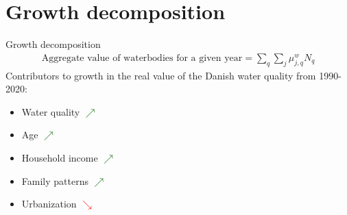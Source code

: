 \section{Growth decomposition}

\begin{frame}{Growth decomposition}
  \begin{align*}
    \text{Aggregate value of waterbodies for a given year}=\sum_q\sum_j\mu_{j,q}^{w}N_q
  \end{align*}
  \pause
    Contributors to growth in the real value of the Danish water quality from 1990-2020:
     \begin{itemize}
      \item Water quality \textcolor{darkgreen}{$\nearrow$}
      \item Age \textcolor{darkgreen}{$\nearrow$}
      \item Household income \textcolor{darkgreen}{$\nearrow$}
      \item Family patterns \textcolor{darkgreen}{$\nearrow$}
      \item Urbanization \textcolor{red}{$\searrow$}
    \end{itemize}
\end{frame}